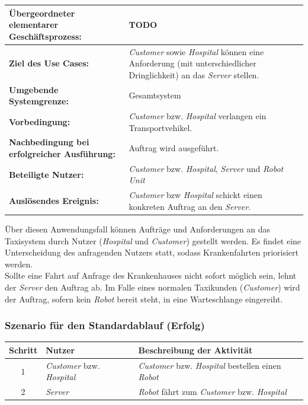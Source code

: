 			\begin{table}[H]
				\centering
				\begin{tabularx}{\textwidth}{|p{5cm}|X|}
					\hline
					\textbf{Übergeordneter elementarer Geschäftsprozess:} & TODO  \\ \hline
					\textbf{Ziel des Use Cases:} & \emph{Customer} sowie \emph{Hospital} können eine Anforderung (mit unterschiedlicher Dringlichkeit) an das \emph{Server} stellen. \\ \hline
					\textbf{Umgebende Systemgrenze:} & Gesamtsystem \\ \hline
					\textbf{Vorbedingung:} & \emph{Customer} bzw. \emph{Hospital} verlangen ein Transportvehikel. \\ \hline
					\textbf{Nachbedingung bei erfolgreicher Ausführung:} & Auftrag wird ausgeführt. \\ \hline
					\textbf{Beteiligte Nutzer:} & \emph{Customer} bzw. \emph{Hospital}, \emph{Server} und \emph{Robot Unit} \\ \hline
					\textbf{Auslösendes Ereignis:} & \emph{Customer} bzw \emph{Hospital} schickt einen konkreten Auftrag an den \emph{Server}. \\
					\hline
				\end{tabularx}
			\end{table}
			
			Über diesen Anwendungsfall können Aufträge und Anforderungen an das Taxisystem durch Nutzer (\emph{Hospital} und \emph{Customer}) gestellt werden.
			Es findet eine Unterscheidung des anfragenden Nutzers statt, sodass Krankenfahrten priorisiert werden. \\ Sollte eine Fahrt auf Anfrage des Krankenhauses nicht sofort möglich sein, lehnt der \emph{Server} den Auftrag ab. Im Falle eines normalen Taxikunden (\emph{Customer}) wird der Auftrag, sofern kein \emph{Robot} bereit steht, in eine Warteschlange eingereiht.
			
				\subsubsection*{Szenario für den Standardablauf (Erfolg)}
	
				\begin{table}[H]
					\centering
					\begin{tabularx}{\textwidth}{|c|p{2cm}|X|}
					\hline
					Schritt & Nutzer & Beschreibung der Aktivität \\ \hline
					1 & \emph{Customer} bzw. \emph{Hospital}  & \emph{Customer} bzw. \emph{Hospital} bestellen einen \emph{Robot} \\
					2 & \emph{Server} & \emph{Robot} fährt zum \emph{Customer} bzw. \emph{Hospital}  \\
					\hline
					\end{tabularx}
				\end{table}

